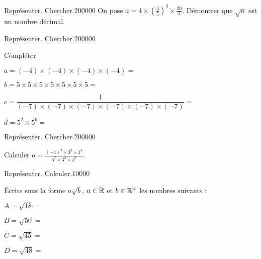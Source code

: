 \begin{pageParcoursu}
\begin{ExoCu}{Représenter. Chercher.}{2}{0}{0}{0}{0}{0}
On pose $a=4\times \left(\frac{3}{5}\right)^3 \times \frac{20}{3}$. Démontrer que $\sqrt{a}$ est un nombre décimal.
\end{ExoCu}


\begin{ExoCu}{Représenter. Chercher.}{2}{0}{0}{0}{0}{0}

Compléter \vspace{0.4cm}

\begin{minipage}{0.48\linewidth}
$a= (-4) \times (-4)\times (-4) \times (-4)  =$  
 
$b= 5 \times 5\times 5 \times 5 \times 5\times 5 \times 5  =$  
\end{minipage}
\vrule
\begin{minipage}{0.48\linewidth}
$c= \dfrac{1}{(-7) \times (-7)\times (-7) \times (-7)\times (-7) \times (-7)}  =$  
 
$d= 5^2 \times 5^6  =$  
\end{minipage}
\end{ExoCu}



\begin{ExoCu}{Représenter. Chercher.}{2}{0}{0}{0}{0}{0}

Calculer $a= \frac{(-4)^2\times 3^2\times 4^3 }{5^2\times 3^2\times 4^3} $.  

\end{ExoCu}

\begin{ExoCuN}{Représenter. Calculer.}{1}{0}{0}{0}{0}

Écrire sous la forme $a\sqrt{b}$, $a\in\mathbb R$ et $b \in \mathbb R^+$ les nombres suivants : \vspace{0.4cm}

\begin{minipage}{0.5\linewidth}
$A = \sqrt{18}=$  

$B=\sqrt{50}=$  

\end{minipage}
\vrule
\begin{minipage}{0.5\linewidth}
$C=\sqrt{45}=$    

$D=\sqrt{48}=$  
\end{minipage}
 
\end{ExoCuN}


 


\end{pageParcoursu} %
 
